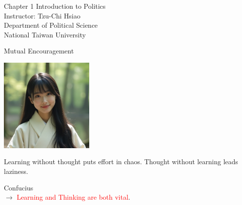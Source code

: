 \documentclass{beamer}
\title{}
\author{}
\date{}
\begin{document}
\begin{frame}
\begin{center}
\Large{Chapter 1 Introduction to Politics} \\
\vspace{3em}
\normalsize{Instructor: Tzu-Chi Hsiao} \\
\vspace{3em}
\small{Department of Political Science} \\
\vspace{1em}
\small{National Taiwan University} \\
\end{center}
\end{frame}
\begin{frame}{Mutual Encouragement}
\begin{center}
\includegraphics[width=0.35\textwidth]{mc.png}
\end{center}
\begin{center}
Learning without thought puts effort in chaos. Thought without learning leads laziness.
\end{center}
\flushright Confucius \\
\flushleft $\rightarrow$ \textcolor{red}{Learning and Thinking are both vital}.
\end{frame}
\end{document}
